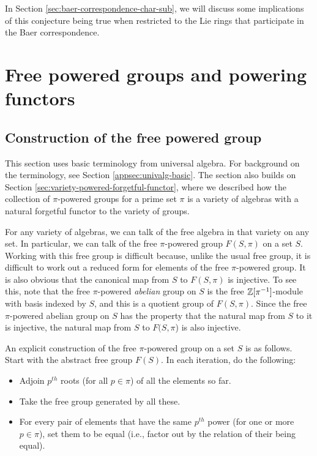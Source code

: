In Section \ref{sec:baer-correspondence-char-sub}, we will discuss
some implications of this conjecture being true when restricted to the
Lie rings that participate in the Baer correspondence.


\section{Free powered groups and powering functors}\label{sec:free-powered-groups-and-powering-functors}

\subsection{Construction of the free powered group}

This section uses basic terminology from universal algebra. For
background on the terminology, see Section
\ref{appsec:univalg-basic}. The section also builds on Section
\ref{sec:variety-powered-forgetful-functor}, where we described how the
collection of $\pi$-powered groups for a prime set $\pi$ is a variety
of algebras with a natural forgetful functor to the variety of groups.

For any variety of algebras, we can talk of the free algebra in that
variety on any set. In particular, we can talk of the free
$\pi$-powered group $F(S,\pi)$ on a set $S$. Working with this free
group is difficult because, unlike the usual free group, it is
difficult to work out a reduced form for elements of the free
$\pi$-powered group. It is also obvious that the canonical map from
$S$ to $F(S,\pi)$ is injective. To see this, note that the free
$\pi$-powered {\em abelian} group on $S$ is the free
$\mathbb{Z}[\pi^{-1}]$-module with basis indexed by $S$, and this is a
quotient group of $F(S,\pi)$. Since the free $\pi$-powered abelian
group on $S$ has the property that the natural map from $S$ to it is
injective, the natural map from $S$ to $F(S,\pi$) is also injective.

An explicit construction of the free $\pi$-powered group on a set $S$
is as follows. Start with the abstract free group $F(S)$. In each
iteration, do the following:

\begin{itemize}
\item Adjoin $p^{th}$ roots (for all $p \in \pi$) of all the elements so far.
\item Take the free group generated by all these.
\item For every pair of elements that have the same
  $p^{th}$ power (for one or more $p \in \pi$), set them
  to be equal (i.e., factor out by the relation of their being
  equal).
\end{itemize}

